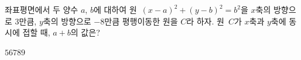 좌표평면에서 두 양수 $a$, $b$에 대하여 원~$(x-a)^2+(y-b)^2=b^2$을 $x$축의 방향으로 $3$만큼, $y$축의 방향으로 $-8$만큼 평행이동한 원을 $C$라 하자. 원~$C$가 $x$축과 $y$축에 동시에 접할 때, $a+b$의 값은?
\begin{choices32}{$5$}{$6$}{$7$}{$8$}{$9$}\end{choices32}

